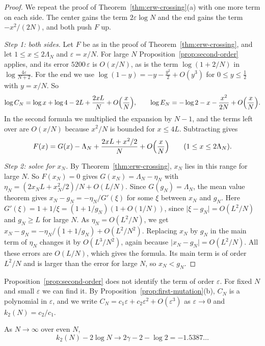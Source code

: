 \begin{proof}
We repeat the proof of Theorem~\ref{thm:erw-crossing}(a) with one more term
on each side. The center gains the term $2\varepsilon\log N$ and the end
gains the term $-x^2/(2N)$, and both push $F$ up.

\emph{Step 1: both sides.} Let $F$ be as in the proof of
Theorem~\ref{thm:erw-crossing}, and let $1\le x\le2\Lambda_N$ and
$\varepsilon=x/N$. For large $N$ Proposition~\ref{prop:second-order} applies,
and its error $5200\,\varepsilon$ is $O(x/N)$, as is the term
$\log(1+2/N)$ in $\log\frac{4\varepsilon}{N+2}$. For the end we use
$\log(1-y)=-y-\frac{y^2}2+O(y^3)$ for $0\le y\le\frac12$ with $y=x/N$. So
\[
 \log C_N=\log x+\log4-2L+\frac{2xL}N+O\Bigl(\frac xN\Bigr),\qquad
 \log E_N=-\log2-x-\frac{x^2}{2N}+O\Bigl(\frac xN\Bigr).
\]
In the second formula we multiplied the expansion by $N-1$, and the terms
left over are $O(x/N)$ because $x^2/N$ is bounded for $x\le4L$. Subtracting
gives
\[
 F(x)=G(x)-\Lambda_N+\frac{2xL+x^2/2}{N}+O\Bigl(\frac xN\Bigr)
 \qquad(1\le x\le2\Lambda_N).
\]

\emph{Step 2: solve for $x_N$.} By Theorem~\ref{thm:erw-crossing}, $x_N$ lies
in this range for large $N$. So $F(x_N)=0$ gives $G(x_N)=\Lambda_N-\eta_N$
with $\eta_N=(2x_NL+x_N^2/2)/N+O(L/N)$. Since $G(g_N)=\Lambda_N$, the mean
value theorem gives
$x_N-g_N=-\eta_N/G'(\xi)$ for some $\xi$ between $x_N$ and $g_N$. Here
$G'(\xi)=1+1/\xi=(1+1/g_N)(1+O(1/N))$, since $\lvert\xi-g_N\rvert=O(L^2/N)$
and $g_N\ge L$ for large $N$. As $\eta_N=O(L^2/N)$, we get
$x_N-g_N=-\eta_N/(1+1/g_N)+O(L^2/N^2)$. Replacing $x_N$ by $g_N$ in the main
term of $\eta_N$ changes it by $O(L^3/N^2)$, again because
$\lvert x_N-g_N\rvert=O(L^2/N)$. All these errors are $O(L/N)$, which gives
the formula. Its main term is of order $L^2/N$ and is larger than the error
for large $N$, so $x_N<g_N$.
\end{proof}

Proposition~\ref{prop:second-order} does not identify the term of order
$\varepsilon$. For fixed $N$ and small $\varepsilon$ we can find it. By
Proposition~\ref{prop:first-mutation}(b), $C_N$ is a polynomial in
$\varepsilon$, and we write
$C_N=c_1\varepsilon+c_2\varepsilon^2+O(\varepsilon^3)$ as $\varepsilon\to0$
and $k_2(N)=c_2/c_1$.

\begin{proposition}\label{prop:K2}
As $N\to\infty$ over even $N$,
\[
 k_2(N)-2\log N\to2\gamma-2-\log2=-1.5387\ldots
\]
\end{proposition}

